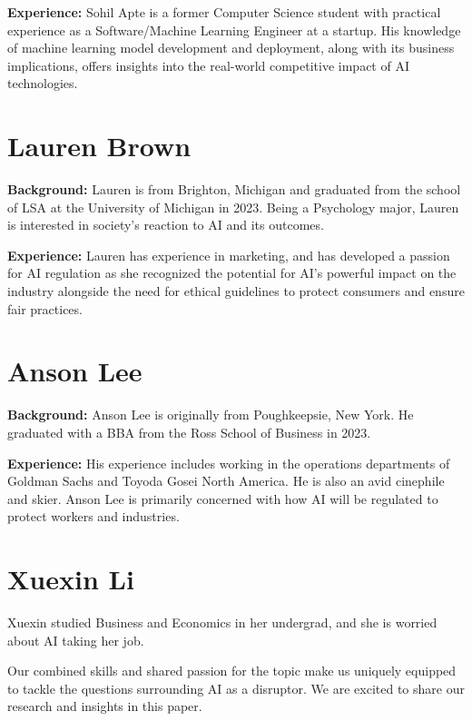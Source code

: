 \documentclass[
]{book}
\begin{document}
\textbf{Experience:}
Sohil Apte is a former Computer Science student with practical experience as a Software/Machine Learning Engineer at a startup. His knowledge of machine learning model development and deployment, along with its business implications, offers insights into the real-world competitive impact of AI technologies.

\hypertarget{lauren-brown}{%
\section{Lauren Brown}\label{lauren-brown}}

\textbf{Background:}
Lauren is from Brighton, Michigan and graduated from the school of LSA at the University of Michigan in 2023. Being a Psychology major, Lauren is interested in society's reaction to AI and its outcomes.

\textbf{Experience:}
Lauren has experience in marketing, and has developed a passion for AI regulation as she recognized the potential for AI's powerful impact on the industry alongside the need for ethical guidelines to protect consumers and ensure fair practices.

\hypertarget{anson-lee}{%
\section{Anson Lee}\label{anson-lee}}

\textbf{Background:}
Anson Lee is originally from Poughkeepsie, New York. He graduated with a BBA from the Ross School of Business in 2023.

\textbf{Experience:}
His experience includes working in the operations departments of Goldman Sachs and Toyoda Gosei North America. He is also an avid cinephile and skier. Anson Lee is primarily concerned with how AI will be regulated to protect workers and industries.

\hypertarget{xuexin-li}{%
\section{Xuexin Li}\label{xuexin-li}}

Xuexin studied Business and Economics in her undergrad, and she is worried about AI taking her job.

Our combined skills and shared passion for the topic make us uniquely equipped to tackle the questions surrounding AI as a disruptor. We are excited to share our research and insights in this paper.
\end{document}
